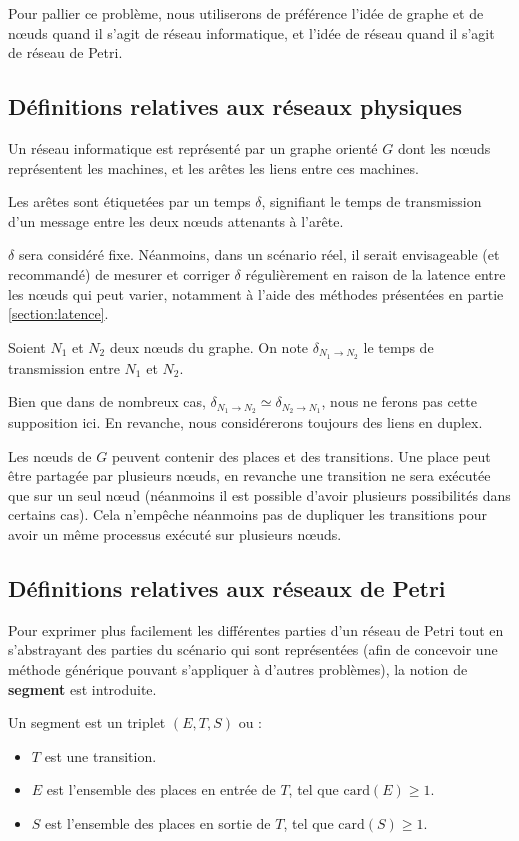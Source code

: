 Pour pallier ce problème, nous utiliserons de préférence l'idée de graphe et de nœuds quand il s'agit de réseau informatique, et l'idée de réseau quand il s'agit de réseau de Petri.

\subsection{Définitions relatives aux réseaux physiques}
\begin{mydef}
Un réseau informatique est représenté par un graphe orienté $G$ dont les nœuds représentent les machines, et les arêtes les liens entre ces machines. 

Les arêtes sont étiquetées par un temps $\delta$, signifiant le temps de transmission d'un message entre les deux nœuds attenants à l'arête.
\end{mydef}
$\delta$ sera considéré fixe. Néanmoins, dans un scénario réel, il serait envisageable (et recommandé) de mesurer et corriger $\delta$ régulièrement en raison de la latence entre les nœuds qui peut varier, notamment à l'aide des méthodes présentées en partie \ref{section:latence}.
\\
\begin{mynot}
	Soient $N_1$ et $N_2$ deux nœuds du graphe. On note $\delta_{N_1 \rightarrow N_2}$ le temps de transmission entre $N_1$ et $N_2$.
\end{mynot} 

Bien que dans de nombreux cas, $\delta_{N_1 \rightarrow N_2} \simeq \delta_{N_2 \rightarrow N_1}$, nous ne ferons pas cette supposition ici. En revanche, nous considérerons toujours des liens en duplex.

Les nœuds de $G$ peuvent contenir des places et des transitions. Une place peut être partagée par plusieurs nœuds, en revanche une transition ne sera exécutée que sur un seul nœud (néanmoins il est possible d'avoir plusieurs possibilités dans certains cas). Cela n'empêche néanmoins pas de dupliquer les transitions pour avoir un même processus exécuté sur plusieurs nœuds.

\subsection{Définitions relatives aux réseaux de Petri}
Pour exprimer plus facilement les différentes parties d'un réseau de Petri tout en s'abstrayant des parties du scénario qui sont représentées (afin de concevoir une méthode générique pouvant s'appliquer à d'autres problèmes), la notion de \textbf{segment} est introduite.
\begin{mydef}[Segment]
Un segment est un triplet $(E, T , S)$ ou : 
\begin{itemize}
	\item $T$ est une transition.
	\item $E$ est l'ensemble des places en entrée de $T$, tel que $\mathrm{card}(E) \geq \num{1}$.
	\item $S$ est l'ensemble des places en sortie de $T$, tel que $\mathrm{card}(S) \geq \num{1}$.
\end{itemize} 
\end{mydef}

